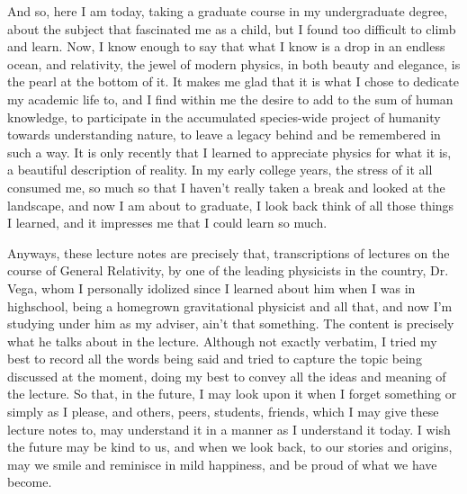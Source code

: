 And so, here I am today, taking a graduate course in my undergraduate degree, about the subject that
fascinated me as a child, but I found too difficult to climb and learn. Now, I know enough to say
that what I know is a drop in an endless ocean, and relativity, the jewel of modern physics, in 
both beauty and elegance, is the pearl at the bottom of it.
It makes me glad that it is what I chose to dedicate my academic life to, and I find within me
the desire to add to the sum of human knowledge, to participate in the accumulated species-wide project
of humanity towards understanding nature, to leave a legacy behind and be remembered
in such a way. It is only recently that I learned
to appreciate physics for what it is, a beautiful description of reality. In my early college years, the
stress of it all consumed me, so much so that I haven't really taken a break and looked at the landscape,
and now I am about to graduate, I look back think of all those things 
I learned, and it impresses me that I could learn so much.

Anyways, these lecture notes are precisely that, transcriptions of lectures on the course of General Relativity,
by one of the leading physicists in the country, Dr. Vega, whom I personally idolized since I
learned about him when I was in highschool, being a homegrown gravitational physicist and all that,
and now I'm studying under him as my adviser, ain't that something.
The content is precisely what he talks about in the lecture. Although not exactly verbatim, I tried 
my best to record all the words being said and tried to capture the topic being discussed at the moment,
doing my best to convey all the ideas and meaning of the lecture. So that, in the future, I may look upon it when I forget something or simply
as I please, and others, peers, students, friends, which I may give these lecture
notes to, may understand it in a manner as I understand it today. I wish the future may be kind to us,
and when we look back, to our stories and origins, may we smile and reminisce in mild happiness,
and be proud of what we have become.

